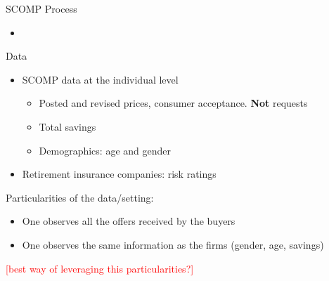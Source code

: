 \documentclass[10pt,aspectratio=169]{beamer}
\begin{document}
\begin{frame}{SCOMP Process}\label{slide:setting2}
\begin{center}

\end{center}
\begin{itemize}
    \item \hyperlink{slide:fig_offer_certificate}{}
\end{itemize}
\end{frame}


\begin{frame}{Data} \label{slide:data}
\begin{itemize}
    \item SCOMP data at the individual level  
    \begin{itemize}
        \item Posted and revised prices, consumer acceptance. \textbf{Not} requests 
        \item Total savings 
        \item Demographics: age and gender \hyperlink{slide:fig_offer_certificate}{}
    \end{itemize}
     \item Retirement insurance companies: risk ratings
\end{itemize}

Particularities of the data/setting: 
\begin{itemize}
    \item One observes all the offers received by the buyers 
    \item One observes the same information as the firms (gender, age, savings)
\end{itemize}
\textcolor{red}{[best way of leveraging this particularities?]}
\end{frame}
\end{document}
